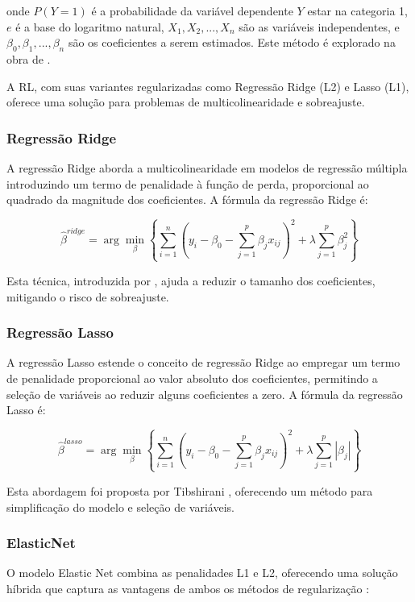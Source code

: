 onde \(P(Y=1)\) é a probabilidade da variável dependente \(Y\) estar na categoria 1, \(e\) é a base do logaritmo natural, \(X_1, X_2, ..., X_n\) são as variáveis independentes, e \(\beta_0, \beta_1, ..., \beta_n\) são os coeficientes a serem estimados. Este método é explorado na obra de \cite{hosmer2013applied}.

A RL, com suas variantes regularizadas como Regressão Ridge (L2) e Lasso (L1), oferece uma solução para problemas de multicolinearidade e sobreajuste.

\subsubsection{Regressão Ridge}

A regressão Ridge aborda a multicolinearidade em modelos de regressão múltipla introduzindo um termo de penalidade à função de perda, proporcional ao quadrado da magnitude dos coeficientes. A fórmula da regressão Ridge é:

\[ \hat{\beta}^{ridge} = \arg\min_\beta \left\{ \sum_{i=1}^{n} (y_i - \beta_0 - \sum_{j=1}^{p} \beta_jx_{ij})^2 + \lambda \sum_{j=1}^{p} \beta_j^2 \right\} \]

Esta técnica, introduzida por \cite{hoerl1970ridge}, ajuda a reduzir o tamanho dos coeficientes, mitigando o risco de sobreajuste.

\subsubsection{Regressão Lasso}

A regressão Lasso estende o conceito de regressão Ridge ao empregar um termo de penalidade proporcional ao valor absoluto dos coeficientes, permitindo a seleção de variáveis ao reduzir alguns coeficientes a zero. A fórmula da regressão Lasso é:

\[ \hat{\beta}^{lasso} = \arg\min_\beta \left\{ \sum_{i=1}^{n} (y_i - \beta_0 - \sum_{j=1}^{p} \beta_jx_{ij})^2 + \lambda \sum_{j=1}^{p} |\beta_j| \right\} \]

Esta abordagem foi proposta por Tibshirani \cite{tibshirani1996regression}, oferecendo um método para simplificação do modelo e seleção de variáveis.
\subsubsection{ElasticNet}

O modelo Elastic Net combina as penalidades L1 e L2, oferecendo uma solução híbrida que captura as vantagens de ambos os métodos de regularização \cite{hastie2009Elements}:

